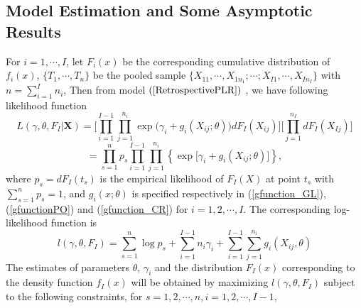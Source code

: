 \documentclass[11pt]{article}
\theoremstyle{plain}
\theoremstyle{definition}
\theoremstyle{remark}
\theoremstyle{definition}
\begin{document}
\subsection{Model Estimation and Some Asymptotic Results}
For $i =  1, \cdots, I$, let $F_i(x)$ be the corresponding cumulative distribution of $f_i(x)$, $\{T_1, \cdots,
T_n \}$ be the pooled sample $\{X_{11}, \cdots, X_{1n_1};\cdots; X_{I1}, \cdots, X_{In_I}\}$ with $n=\sum_{i=1}^In_i$, Then from model $(\ref{RetrospectivePLR})$ , we have following likelihood function
$$ L(\gamma, \theta, F_I|\mathbf{X})=\Big[\prod_{i=1}^{I-1} \prod_{j=1}^{n_i}
\exp\Big(\gamma_i+g_i(X_{ij};\theta)\Big)dF_I(X_{ij}) \Big]\Big[\prod_{j=1}^{n_I} dF_I(X_{Ij})\Big] $$
\begin{equation}
=\prod_{s=1}^n p_s \prod_{i=1}^{I-1} \prod_{j=1}^{n_i}\left\{\exp\Big[ \gamma_i+g_i(X_{ij};\theta )\Big]\right\},
\label{lik}
\end{equation}
where $p_s=dF_I(t_s)$ is the empirical likelihood of $F_I(X)$ at point $t_s$ with $\sum_{s=1}^n p_s=1$, and $g_i(x;\theta)$ is specified respectively in (\ref{gfunction_GL}), (\ref{gfunctionPO}) and (\ref{gfunction_CR}) for $i=1, 2,\cdots, I$. The corresponding log-likelihood function is
\begin{equation}
l(\gamma,\theta, F_I) =\sum_{s=1}^n \log p_s + \sum_{i=1}^{I-1}n_i\gamma_i+ \sum_{i=1}^{I-1}\sum_{j=1}^{n_i}
g_i(X_{ij},\theta)  \label{loglikelihood}
\end{equation}
The estimates of parameters $\theta$, $\gamma_i$ and the distribution $F_I(x)$ corresponding to the density function
$f_I(x)$ will be obtained  by maximizing $l(\gamma, \theta, F_I)$ subject to the following constraints, for $s=1, 2, \cdots, n, i =1, 2, \cdots, I-1$,
\end{document}

